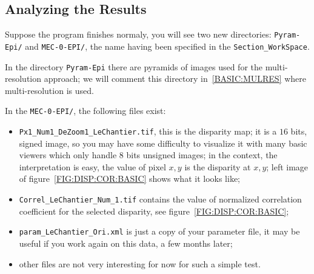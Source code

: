 \subsection{Analyzing the Results }

Suppose the program finishes normaly, you will see two new
directories: {\tt Pyram-Epi/} and {\tt MEC-0-EPI/}, the name having
been  specified in the {\tt Section\_WorkSpace}.


In the directory {\tt Pyram-Epi} there are pyramids
of images used for the multi-resolution approach; we will comment this
directory in~\ref{BASIC:MULRES} where multi-resolution is used.

In the {\tt MEC-0-EPI/}, the following files exist:

\begin{itemize}

   \item {\tt Px1\_Num1\_DeZoom1\_LeChantier.tif}, this is the disparity map;
         it is a $16$ bits, signed image, so you may have some difficulty to
         visualize it with many basic viewers which only handle $8$ bits unsigned images;  
         in the context, the interpretation is
         easy, the value of pixel $x,y$ is the disparity at $x,y$;
         left image of figure~\ref{FIG:DISP:COR:BASIC} shows what it looks like;

    \item {\tt Correl\_LeChantier\_Num\_1.tif} contains the value of normalized
         correlation coefficient for the selected disparity, see figure~\ref{FIG:DISP:COR:BASIC};

     \item {\tt param\_LeChantier\_Ori.xml} is just a copy of your parameter file,
           it may be useful if you work again on this data, a few months later;

     \item other files are not very interesting for now for such a simple test.
\end{itemize}

